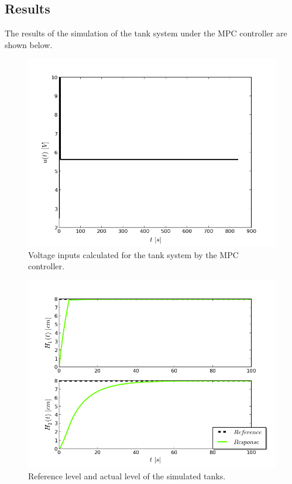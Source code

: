\subsection{Results}

The results of the simulation of the tank system under the MPC controller are shown below. 

\begin{figure}[H]
\centering
\includegraphics[scale=0.7]{Images/Chapter5/tank_system/control_signal.png}
\caption{Voltage inputs calculated for the tank system by the MPC controller.}
\label{fig:tanks_inputs}
\end{figure}

\begin{figure}[H]
\centering
\includegraphics[scale=0.7]{Images/Chapter5/tank_system/levels_control.png}
\caption{Reference level and actual level of the simulated tanks.}
\label{fig:tanks_states}
\end{figure}


